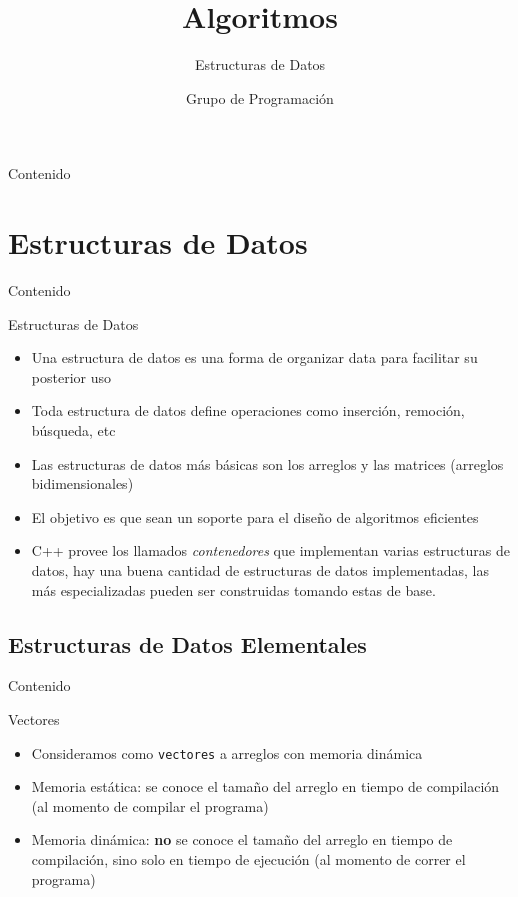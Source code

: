 \documentclass[]{beamer}
\title{Algoritmos}
\subtitle{Estructuras de Datos}
\author{Grupo de Programaci\'on}
\institute{Campamento de Programaci\'on}
\date{}
\begin{document}
\maketitle

\begin{frame}{Contenido}
\tableofcontents
\end{frame}

\section{Estructuras de Datos}
\begin{frame}{Contenido}
\tableofcontents[currentsection]
\end{frame}

\begin{frame}{Estructuras de Datos}
  \begin{itemize}
    \item Una estructura de datos es una forma de organizar data para facilitar su posterior uso
      \pause
    \item Toda estructura de datos define operaciones como inserci\'on, remoci\'on, b\'usqueda, etc
      \pause
    \item Las estructuras de datos m\'as b\'asicas son los arreglos y las matrices (arreglos bidimensionales)
      \pause
    \item El objetivo es que sean un soporte para el dise\~no de algoritmos eficientes
      \pause
    \item C++ provee los llamados \textit{contenedores} que implementan varias estructuras de datos, hay una buena cantidad de estructuras de datos implementadas, las m\'as especializadas pueden ser construidas tomando estas de base.
  \end{itemize}
\end{frame}

\subsection{Estructuras de Datos Elementales}
\begin{frame}{Contenido}
\tableofcontents
\end{frame}

\begin{frame}{Vectores}
  \begin{itemize}
    \item Consideramos como \texttt{vectores} a arreglos con memoria din\'amica
      \pause
    \item Memoria est\'atica: se conoce el tama\~no del arreglo en tiempo de compilaci\'on (al momento de compilar el programa)
      \pause
    \item Memoria din\'amica: \textbf{no} se conoce el tama\~no del arreglo en tiempo de compilaci\'on, sino solo en tiempo de ejecuci\'on (al momento de correr el programa)
  \end{itemize}
\end{frame}
\end{document}
